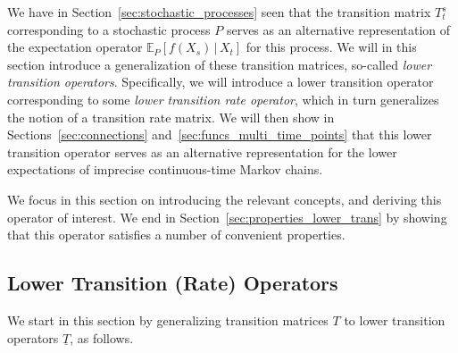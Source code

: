 \documentclass[10pt,a4paper]{paper}
\theoremstyle{definition}
\newcommand{\states}{\mathcal{X}}
\newcommand{\lt}{\underline{T}}
\newcommand{\gambles}{\mathcal{L}}
\newcommand{\gamblesX}{\gambles(\states)}
\begin{document}
We have in Section~\ref{sec:stochastic_processes} seen that the transition matrix $T_t^s$ corresponding to a stochastic process $P$ serves as an alternative representation of the expectation operator $\mathbb{E}_P[f(X_s)\,\vert\,X_t]$ for this process. We will in this section introduce a generalization of these transition matrices, so-called \emph{lower transition operators}. Specifically, we will introduce a lower transition operator corresponding to some \emph{lower transition rate operator}, which in turn generalizes the notion of a transition rate matrix. We will then show in Sections~\ref{sec:connections} and~\ref{sec:funcs_multi_time_points} that this lower transition operator serves as an alternative representation for the lower expectations of imprecise continuous-time Markov chains.

We focus in this section on introducing the relevant concepts, and deriving this operator of interest. We end in Section~\ref{sec:properties_lower_trans} by showing that this operator satisfies a number of convenient properties.

\subsection{Lower Transition (Rate) Operators}\label{subsec:lowertrans_rate}

We start in this section by generalizing transition matrices $T$ to lower transition operators $\lt$, as follows.
\end{document}
